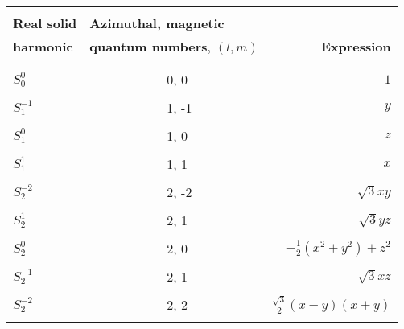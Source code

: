 \documentclass[../../master.tex]{subfiles}
\begin{document}
\begin{table}[p]
\centering
\setlength\extrarowheight{2pt}
\begin{tabularx}{\textwidth}{l X  r}
\hline
\hline
\\[-0.9em]
{\bf Real solid}  & {\bf Azimuthal, magnetic}       & \\ 
{\bf harmonic}    & {\bf quantum numbers}, $(l,m)$  & {\bf Expression} \\
\\[-0.9em]
\hline
\\[-0.9em]
$S_0^0$    & \ \ \ \ \ \ \ \ \ \ \ \ 0, 0 & $\displaystyle 1$ \\
\\[-0.5em]

$S_1^{-1}$ & \ \ \ \ \ \ \ \ \ \ \ \ 1, -1 & $\displaystyle y$ \\
\\[-0.5em]
$S_1^0$    & \ \ \ \ \ \ \ \ \ \ \ \ 1, 0 & $\displaystyle z$ \\
\\[-0.5em]
$S_1^1$    & \ \ \ \ \ \ \ \ \ \ \ \ 1, 1 & $\displaystyle x$ \\
\\[-0.5em]

$S_2^{-2}$    & \ \ \ \ \ \ \ \ \ \ \ \ 2, -2 & $\displaystyle \sqrt{3}xy$ \\
\\[-0.5em]
$S_2^1$       & \ \ \ \ \ \ \ \ \ \ \ \ 2, 1 & $\displaystyle \sqrt{3}yz$ \\
\\[-0.5em]
$S_2^0$       & \ \ \ \ \ \ \ \ \ \ \ \ 2, 0 & $\displaystyle -\frac{1}{2}(x^2+y^2)+z^2$ \\
\\[-0.5em]
$S_2^{-1}$    & \ \ \ \ \ \ \ \ \ \ \ \ 2, 1 & $\displaystyle \sqrt{3}xz$ \\
\\[-0.5em]
$S_2^{-2}$    & \ \ \ \ \ \ \ \ \ \ \ \ 2, 2 & $\displaystyle \frac{\sqrt{3}}{2}(x-y)(x+y)$ \\
\\[-0.5em]


\end{tabularx}
\end{table}
\end{document}
